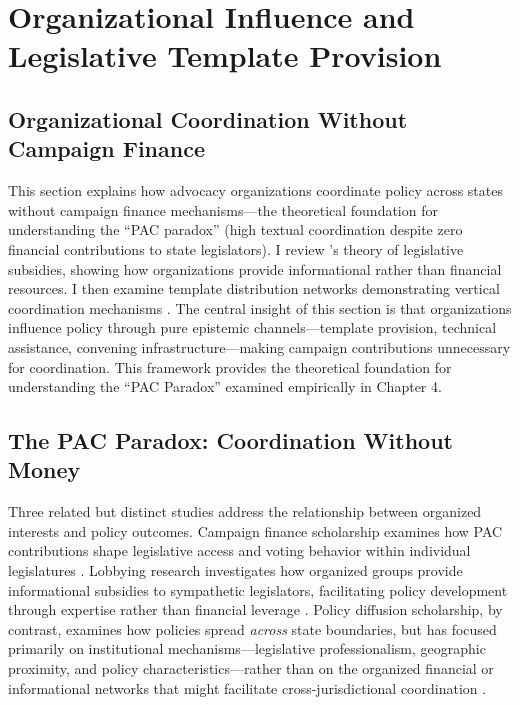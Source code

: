 \section{Organizational Influence and Legislative Template Provision}
\label{sec:organizations}

\subsection{Organizational Coordination Without Campaign Finance}

This section explains how advocacy organizations coordinate policy across states without campaign finance mechanisms---the theoretical foundation for understanding the ``PAC paradox'' (high textual coordination despite zero financial contributions to state legislators). I review \textcite{hallLobbyingLegislativeSubsidy2006a}'s theory of legislative subsidies, showing how organizations provide informational rather than financial resources. I then examine template distribution networks demonstrating vertical coordination mechanisms \parencite{hertel-fernandezStateCapture2019}. The central insight of this section is that organizations influence policy through pure epistemic channels---template provision, technical assistance, convening infrastructure---making campaign contributions unnecessary for coordination. This framework provides the theoretical foundation for understanding the ``PAC Paradox'' examined empirically in Chapter 4.

\subsection{The PAC Paradox: Coordination Without Money}

Three related but distinct studies address the relationship between organized interests and policy outcomes. Campaign finance scholarship examines how PAC contributions shape legislative access and voting behavior within individual legislatures \parencite{hallBuyingTimeMoneyed}. Lobbying research investigates how organized groups provide informational subsidies to sympathetic legislators, facilitating policy development through expertise rather than financial leverage \parencite{hallLobbyingLegislativeSubsidy2006a,baumgartnerLobbyingPolicyChange}. Policy diffusion scholarship, by contrast, examines how policies spread \textit{across} state boundaries, but has focused primarily on institutional mechanisms---legislative professionalism, geographic proximity, and policy characteristics---rather than on the organized financial or informational networks that might facilitate cross-jurisdictional coordination \parencite{shipanMechanismsPolicyDiffusion2008a,boehmkeStatePolicyInnovativeness2012a}.

